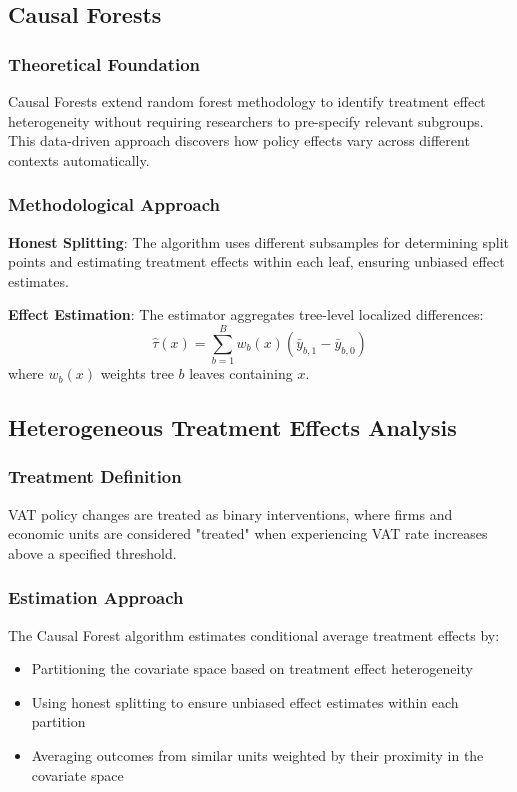 \subsection{Causal Forests}\label{subsec:cforests}

\subsubsection{Theoretical Foundation}
Causal Forests extend random forest methodology to identify treatment effect heterogeneity without requiring researchers to pre-specify relevant subgroups. This data-driven approach discovers how policy effects vary across different contexts automatically.

\subsubsection{Methodological Approach}
\textbf{Honest Splitting}: The algorithm uses different subsamples for determining split points and estimating treatment effects within each leaf, ensuring unbiased effect estimates.

\textbf{Effect Estimation}: The estimator aggregates tree-level localized differences:
\begin{equation}
  \hat{\tau}(x) = \sum_{b=1}^B w_b(x) \left( \bar{y}_{b,1} - \bar{y}_{b,0} \right)
\end{equation}
where $w_b(x)$ weights tree $b$ leaves containing $x$.

\subsection{Heterogeneous Treatment Effects Analysis}\label{subsec:heterogeneous}

\subsubsection{Treatment Definition}
VAT policy changes are treated as binary interventions, where firms and economic units are considered "treated" when experiencing VAT rate increases above a specified threshold.

\subsubsection{Estimation Approach}
The Causal Forest algorithm estimates conditional average treatment effects by:
\begin{itemize}
    \item Partitioning the covariate space based on treatment effect heterogeneity
    \item Using honest splitting to ensure unbiased effect estimates within each partition
    \item Averaging outcomes from similar units weighted by their proximity in the covariate space
\end{itemize}

